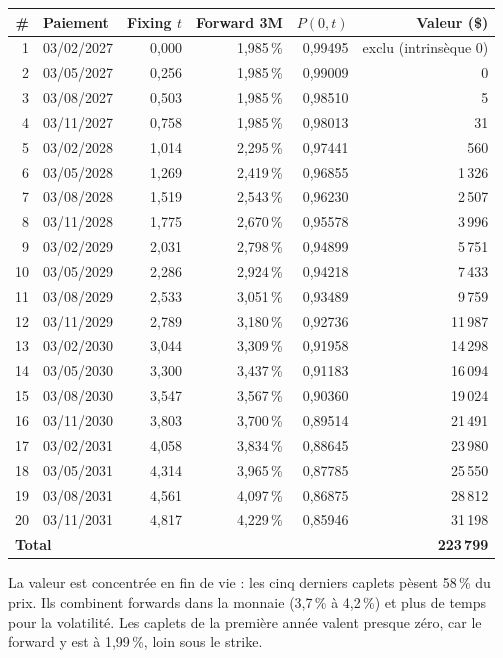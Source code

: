 \documentclass[11pt,a4paper]{article}
\begin{document}
\begin{longtable}{rlrrrr}
\toprule
\# & Paiement & Fixing $t$ & Forward 3M & $P(0,t)$ & Valeur (\$) \\
\midrule
\endhead
1  & 03/02/2027 & 0,000 & 1,985\,\% & 0,99495 & exclu (intrinsèque 0) \\
2  & 03/05/2027 & 0,256 & 1,985\,\% & 0,99009 & 0 \\
3  & 03/08/2027 & 0,503 & 1,985\,\% & 0,98510 & 5 \\
4  & 03/11/2027 & 0,758 & 1,985\,\% & 0,98013 & 31 \\
5  & 03/02/2028 & 1,014 & 2,295\,\% & 0,97441 & 560 \\
6  & 03/05/2028 & 1,269 & 2,419\,\% & 0,96855 & 1\,326 \\
7  & 03/08/2028 & 1,519 & 2,543\,\% & 0,96230 & 2\,507 \\
8  & 03/11/2028 & 1,775 & 2,670\,\% & 0,95578 & 3\,996 \\
9  & 03/02/2029 & 2,031 & 2,798\,\% & 0,94899 & 5\,751 \\
10 & 03/05/2029 & 2,286 & 2,924\,\% & 0,94218 & 7\,433 \\
11 & 03/08/2029 & 2,533 & 3,051\,\% & 0,93489 & 9\,759 \\
12 & 03/11/2029 & 2,789 & 3,180\,\% & 0,92736 & 11\,987 \\
13 & 03/02/2030 & 3,044 & 3,309\,\% & 0,91958 & 14\,298 \\
14 & 03/05/2030 & 3,300 & 3,437\,\% & 0,91183 & 16\,094 \\
15 & 03/08/2030 & 3,547 & 3,567\,\% & 0,90360 & 19\,024 \\
16 & 03/11/2030 & 3,803 & 3,700\,\% & 0,89514 & 21\,491 \\
17 & 03/02/2031 & 4,058 & 3,834\,\% & 0,88645 & 23\,980 \\
18 & 03/05/2031 & 4,314 & 3,965\,\% & 0,87785 & 25\,550 \\
19 & 03/08/2031 & 4,561 & 4,097\,\% & 0,86875 & 28\,812 \\
20 & 03/11/2031 & 4,817 & 4,229\,\% & 0,85946 & 31\,198 \\
\midrule
\multicolumn{5}{l}{\textbf{Total}} & \textbf{223\,799} \\
\bottomrule
\end{longtable}

La valeur est concentrée en fin de vie : les cinq derniers caplets pèsent 58\,\% du prix. Ils combinent forwards dans la monnaie (3,7\,\% à 4,2\,\%) et plus de temps pour la volatilité. Les caplets de la première année valent presque zéro, car le forward y est à 1,99\,\%, loin sous le strike.
\end{document}
